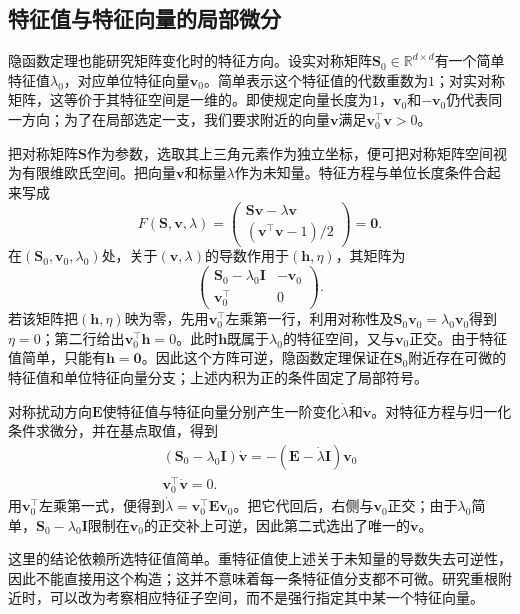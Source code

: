 \subsection{特征值与特征向量的局部微分}

隐函数定理也能研究矩阵变化时的特征方向。设实对称矩阵$\bm S_0\in\mathbb R^{d\times d}$有一个简单特征值$\lambda_0$，对应单位特征向量$\bm v_0$。简单表示这个特征值的代数重数为$1$；对实对称矩阵，这等价于其特征空间是一维的。即使规定向量长度为$1$，$\bm v_0$和$-\bm v_0$仍代表同一方向；为了在局部选定一支，我们要求附近的向量$\bm v$满足$\bm v_0^\top\bm v>0$。

把对称矩阵$\bm S$作为参数，选取其上三角元素作为独立坐标，便可把对称矩阵空间视为有限维欧氏空间。把向量$\bm v$和标量$\lambda$作为未知量。特征方程与单位长度条件合起来写成
\[
 F(\bm S,\bm v,\lambda)=
 \begin{pmatrix}\bm S\bm v-\lambda\bm v\\ (\bm v^\top\bm v-1)/2\end{pmatrix}=\bm0.
\]
在$(\bm S_0,\bm v_0,\lambda_0)$处，关于$(\bm v,\lambda)$的导数作用于$(\bm h,\eta)$，其矩阵为
\[
 \begin{pmatrix}\bm S_0-\lambda_0\bm I&-\bm v_0\\
 \bm v_0^\top&0\end{pmatrix}.
\]
若该矩阵把$(\bm h,\eta)$映为零，先用$\bm v_0^\top$左乘第一行，利用对称性及$\bm S_0\bm v_0=\lambda_0\bm v_0$得到$\eta=0$；第二行给出$\bm v_0^\top\bm h=0$。此时$\bm h$既属于$\lambda_0$的特征空间，又与$\bm v_0$正交。由于特征值简单，只能有$\bm h=\bm0$。因此这个方阵可逆，隐函数定理保证在$\bm S_0$附近存在可微的特征值和单位特征向量分支；上述内积为正的条件固定了局部符号。

对称扰动方向$\bm E$使特征值与特征向量分别产生一阶变化$\dot\lambda$和$\dot{\bm v}$。对特征方程与归一化条件求微分，并在基点取值，得到
\[
 \begin{gathered}
(\bm S_0-\lambda_0\bm I)\dot{\bm v}
 =-(\bm E-\dot\lambda\bm I)\bm v_0\\
\bm v_0^\top\dot{\bm v}=0.
 \end{gathered}
\]
用$\bm v_0^\top$左乘第一式，便得到$\dot\lambda=\bm v_0^\top\bm E\bm v_0$。把它代回后，右侧与$\bm v_0$正交；由于$\lambda_0$简单，$\bm S_0-\lambda_0\bm I$限制在$\bm v_0$的正交补上可逆，因此第二式选出了唯一的$\dot{\bm v}$。

这里的结论依赖所选特征值简单。重特征值使上述关于未知量的导数失去可逆性，因此不能直接用这个构造；这并不意味着每一条特征值分支都不可微。研究重根附近时，可以改为考察相应特征子空间，而不是强行指定其中某一个特征向量。
